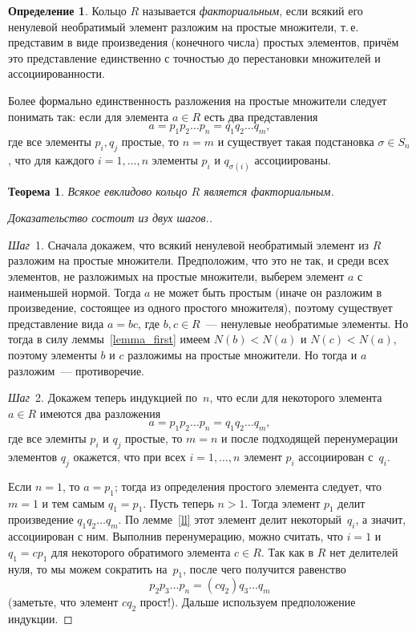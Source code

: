\documentclass[a4paper,10pt]{amsart}
\newtheorem{theorem}{Теорема}
\theoremstyle{definition}
\newtheorem{definition}{Определение}
\theoremstyle{remark}
\begin{document}
\begin{definition}
Кольцо $R$ называется {\it факториальным}, если всякий его ненулевой
необратимый элемент \guillemotleft разложим на простые
множители\guillemotright{}, т.\,е. представим в виде произведения
(конечного числа) простых элементов, причём это представление
единственно с точностью до перестановки множителей и
ассоциированности.
\end{definition}

Более формально единственность разложения на простые множители
следует понимать так: если для элемента $a \in R$ есть два
представления
$$
a = p_1 p_2 \ldots p_n = q_1q_2 \ldots q_m,
$$
где все элементы $p_i, q_j$ простые, то $n = m$ и существует такая
подстановка $\sigma \in S_n$, что для каждого $i = 1,\ldots, n$
элементы $p_i$ и $q_{\sigma(i)}$ ассоциированы.

\begin{theorem} \label{thm_er_ufd}
Всякое евклидово кольцо $R$ является факториальным.
\end{theorem}

\begin{proof}[Доказательство \textup{состоит из двух шагов.}]~

\textit{Шаг}~1. Сначала докажем, что всякий ненулевой необратимый
элемент из $R$ разложим на простые множители. Предположим, что это
не так, и среди всех элементов, не разложимых на простые множители,
выберем элемент $a$ с наименьшей нормой. Тогда $a$ не может быть
простым (иначе он разложим в произведение, состоящее из одного
простого множителя), поэтому существует представление вида $a = bc$,
где $b,c \in R$~--- ненулевые необратимые элементы. Но тогда в силу
леммы~\ref{lemma_first} имеем $N(b) < N(a)$ и $N(c) < N(a)$, поэтому
элементы $b$ и $c$ разложимы на простые множители. Но тогда и $a$
разложим~--- противоречие.

\textit{Шаг}~2. Докажем теперь индукцией по~$n$, что если для
некоторого элемента $a \in R$ имеются два разложения
$$
a = p_1p_2\ldots p_n=q_1q_2\ldots q_m,
$$
где все элемнты $p_i$ и $q_j$ простые, то $m=n$ и после подходящей
перенумерации элементов $q_j$ окажется, что при всех $i = 1,\ldots,
n$ элемент $p_i$ ассоциирован с~$q_i$.

Если $n=1$, то $a = p_1$; тогда из определения простого элемента
следует, что $m = 1$ и тем самым $q_1 = p_1$. Пусть теперь $n > 1$.
Тогда элемент $p_1$ делит произведение $q_1 q_2 \ldots q_m$. По
лемме~\ref{ll} этот элемент делит некоторый~$q_i$, а значит,
ассоциирован с ним. Выполнив перенумерацию, можно считать, что $i =
1$ и $q_1 = cp_1$ для некоторого обратимого элемента $c \in R$. Так
как в $R$ нет делителей нуля, то мы можем сократить на~$p_1$, после
чего получится равенство
$$
p_2 p_3 \ldots p_n = (cq_2)q_3 \ldots q_m
$$
(заметьте, что элемент $cq_2$ прост!). Дальше используем
предположение индукции.
\end{proof}
\end{document}
